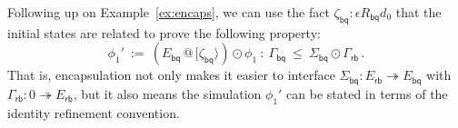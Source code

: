\documentclass[acmsmall,screen,review,nonacm]{acmart}
\newcommand{\kw}[1]{\ensuremath{ \mathsf{#1} }}
\newcommand{\vcomp}{\fatsemi}
\newcommand{\sepconj}{\oast}
\newcommand{\emptysig}{0}
\begin{document}

\begin{example} %
Following up on Example~\ref{ex:encaps},
we can use the fact $\zeta_\kw{bq} : \epsilon \mathbin{R_\kw{bq}} d_0$
that the initial states are related
to prove the following property:
\[
  \phi_1' \: := \:
  (E_\kw{bq} \mathbin@ [\zeta_\kw{bq}\rangle) \odot \phi_1
  \: : \:
  \Gamma_\kw{bq} \: \le \: \Sigma_\kw{bq} \odot \Gamma_\kw{rb}
  \,.
\]
That is, encapsulation not only makes it easier
to interface $\Sigma_\kw{bq} : E_\kw{rb} \twoheadrightarrow E_\kw{bq}$
with $\Gamma_\kw{rb} : \emptysig \twoheadrightarrow E_\kw{rb}$,
but it also means the simulation
$\phi_1'$ can be stated in terms of the identity refinement convention.


\end{example}
\end{document}
